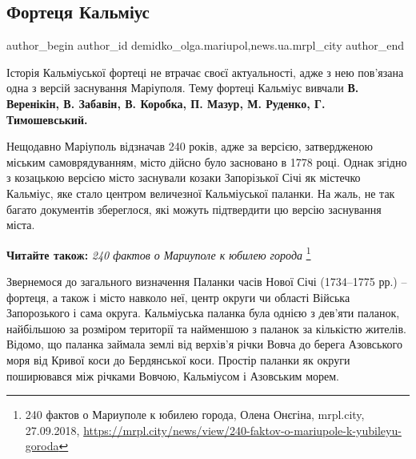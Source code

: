  
 
 
 
 
 
\subsection{Фортеця Кальміус}
\label{sec:08_11_2018.stz.news.ua.mrpl_city.1.fortecja_kalmius}
 
\ifcmt
 author_begin
   author_id demidko_olga.mariupol,news.ua.mrpl_city
 author_end
\fi


Історія Кальміуської фортеці не втрачає своєї актуальності, адже з нею
пов'язана одна з версій заснування Маріуполя. Тему фортеці Кальміус вивчали \textbf{В.
Веренікін, В. Забавін, В. Коробка, П. Мазур, М. Руденко, Г. Тимошевський.}

Нещодавно Маріуполь відзначав 240 років, адже за версією, затвердженою міським
самоврядуванням, місто дійсно було засновано в 1778 році. Однак згідно з
козацькою версією місто заснували козаки Запорізької Січі як містечко Кальміус,
яке стало центром величезної Кальміуської паланки. На жаль, не так багато
документів збереглося, які можуть підтвердити цю версію заснування міста.

\textbf{Читайте також:} \emph{240 фактов о Мариуполе к юбилею города}%
\footnote{240 фактов о Мариуполе к юбилею города, Олена Онєгіна, mrpl.city, 27.09.2018, \url{https://mrpl.city/news/view/240-faktov-o-mariupole-k-yubileyu-goroda}}

Звернемося до загального визначення Паланки часів Нової Січі (1734–1775 рр.) –
фортеця, а також і місто навколо неї, центр округи чи області Війська
Запорозького і сама округа. Кальміуська паланка була однією з дев'яти паланок,
найбільшою за розміром території та найменшою з паланок за кількістю жителів.
Відомо, що паланка займала землі від верхів'я річки Вовча до берега Азовського
моря від Кривої коси до Бердянської коси. Простір паланки як округи поширювався
між річками Вовчою, Кальміусом і Азовським морем.

